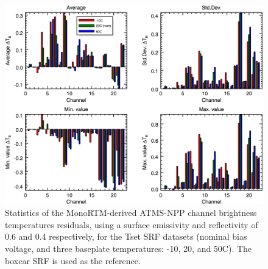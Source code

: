 \begin{figure}[H]
  \centering
    \includegraphics[bb=0 0 416 333,clip,scale=0.9]{graphics/dtb/Tset/e0.6_r0.4/stats_ref-boxcar.png} 
  \caption{Statistics of the MonoRTM-derived ATMS-NPP channel brightness temperatures residuals, using a surface emissivity and reflectivity of 0.6 and 0.4 respectively, for the Tset SRF datasets (nominal bias voltage, and three baseplate temperatures: -10, 20, and 50\textdegree{}C). The boxcar SRF is used as the reference.}
  \label{fig:Tset_e0.6_r0.4_stats_ref-boxcar}
\end{figure}

